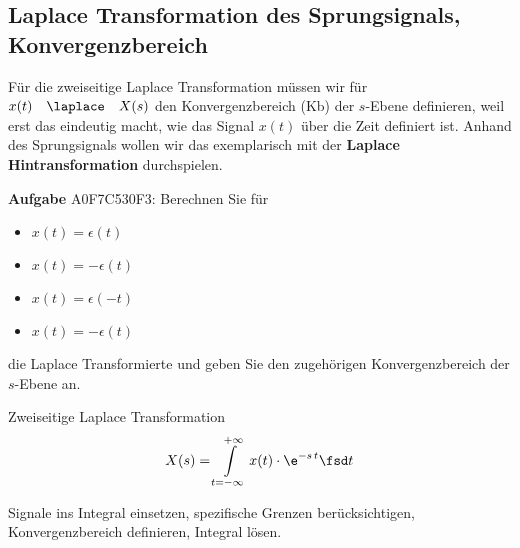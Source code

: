 \subsection{Laplace Transformation des Sprungsignals, Konvergenzbereich}
\label{sec:A0F7C530F3}
\begin{Ziel}
Für die zweiseitige Laplace Transformation müssen wir für
$x(t) \quad \laplace \quad X(s)$
den Konvergenzbereich (Kb) der $s$-Ebene definieren, weil erst das eindeutig
macht, wie das Signal $x(t)$ über die Zeit definiert ist.
Anhand des Sprungsignals wollen wir das exemplarisch mit der
\textbf{Laplace Hintransformation} durchspielen.
\end{Ziel}
\textbf{Aufgabe} {\tiny A0F7C530F3}: Berechnen Sie für
\begin{itemize}
  \item $x(t)=\epsilon(t)$
  \item $x(t)=-\epsilon(t)$
  \item $x(t)=\epsilon(-t)$
  \item $x(t)=-\epsilon(t)$
\end{itemize}
die Laplace Transformierte und geben Sie den zugehörigen Konvergenzbereich
der $s$-Ebene an.
\begin{Werkzeug}
Zweiseitige Laplace Transformation
\begin{align}
X(s) = \int\limits_{t=-\infty}^{+\infty} x(t) \cdot \e^{-s\,t} \fsd t
\end{align}
\end{Werkzeug}
\begin{Ansatz}
Signale ins Integral einsetzen, spezifische Grenzen berücksichtigen,
Konvergenzbereich definieren, Integral lösen.
\end{Ansatz}
